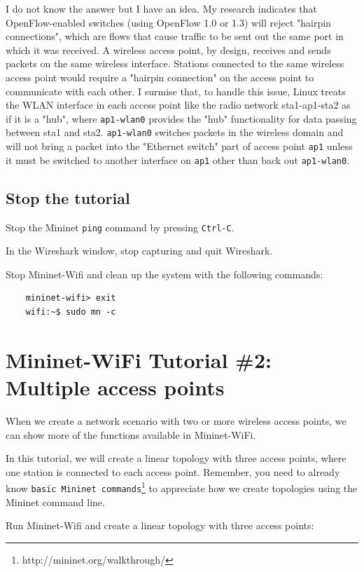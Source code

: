 I do not know the answer but I have an idea. My research indicates that OpenFlow-enabled switches (using OpenFlow 1.0 or 1.3) will reject "hairpin connections", which are flows that cause traffic to be sent out the same port in which it was received. A wireless access point, by design, receives and sends packets on the same wireless interface. Stations connected to the same wireless access point would require a "hairpin connection" on the access point to communicate with each other. I surmise that, to handle this issue, Linux treats the WLAN interface in each access point like the radio network sta1-ap1-sta2 as if it is a "hub", where \texttt{ap1-wlan0} provides the "hub" functionality for data passing between sta1 and sta2. \texttt{ap1-wlan0} switches packets in the wireless domain and will not bring a packet into the "Ethernet switch" part of access point \texttt{ap1} unless it must be switched to another interface on \texttt{ap1} other than back out \texttt{ap1-wlan0}.

\subsection{Stop the tutorial}

Stop the Mininet \texttt{ping} command by pressing \texttt{Ctrl-C}. 

\noindent In the Wireshark window, stop capturing and quit Wireshark.

\noindent Stop Mininet-Wifi and clean up the system with the following commands:

\begin{verbatim}
    mininet-wifi> exit
    wifi:~$ sudo mn -c
\end{verbatim}
    
\section{Mininet-WiFi Tutorial \#2: Multiple access points}

When we create a network scenario with two or more wireless access points, we can show more of the functions available in Mininet-WiFi. 

In this tutorial, we will create a linear topology with three access points, where one station is connected to each access point. Remember, you need to already know \texttt{basic Mininet commands}\footnote{http://mininet.org/walkthrough/} to appreciate how we create topologies using the Mininet command line. 

Run Mininet-Wifi and create a linear topology with three access points:

